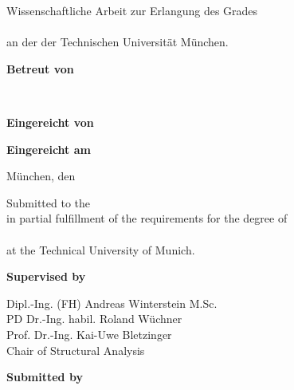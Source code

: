 \ifx\lan\deutsch 

\fontsize{14.4pt}{17.5pt}\selectfont%
Wissenschaftliche Arbeit zur Erlangung des Grades\\
\Grad\\
an der \Fakultaet{} der Technischen Universität München.

\renewcommand{\baselinestretch}{1.47}
\normalsize\selectfont
\vspace*{17.1mm}
\textbf{Betreut von}\tab
\begin{minipage}[t]{\textwidth-\CurrentLineWidth}
	\BetreutVonPerson\\
	\BetreutVonLehrstuhl\strut
\end{minipage}

\vspace*{4.3mm}
\textbf{Eingereicht von}\tab
\begin{minipage}[t]{\textwidth-\CurrentLineWidth}
	\EingereichtVon
\end{minipage}

\vspace*{-1mm}
\textbf{Eingereicht am}\tab 
\begin{minipage}[t]{\textwidth-\CurrentLineWidth}
	München, den \Datum\strut
\end{minipage}

\else

\fontsize{14.4pt}{17.5pt}\selectfont%
Submitted to the \Fakultaet{}\\
in partial fulfillment of the requirements for the degree of\\
\Grad\\
at the Technical University of Munich.

\renewcommand{\baselinestretch}{1.47}
\normalsize\selectfont
\vspace*{17.1mm}
\textbf{Supervised by}\tab
\begin{minipage}[t]{\textwidth-\CurrentLineWidth}
	Dipl.-Ing. (FH) Andreas Winterstein M.Sc. \\
	PD Dr.-Ing. habil. Roland W\"{u}chner \\
	Prof. Dr.-Ing. Kai-Uwe Bletzinger \\
	Chair of Structural Analysis
\end{minipage}

\vspace*{4.3mm}
\textbf{Submitted by}\tab
\begin{minipage}[t]{\textwidth-\CurrentLineWidth}
	\EingereichtVon
\end{minipage}

